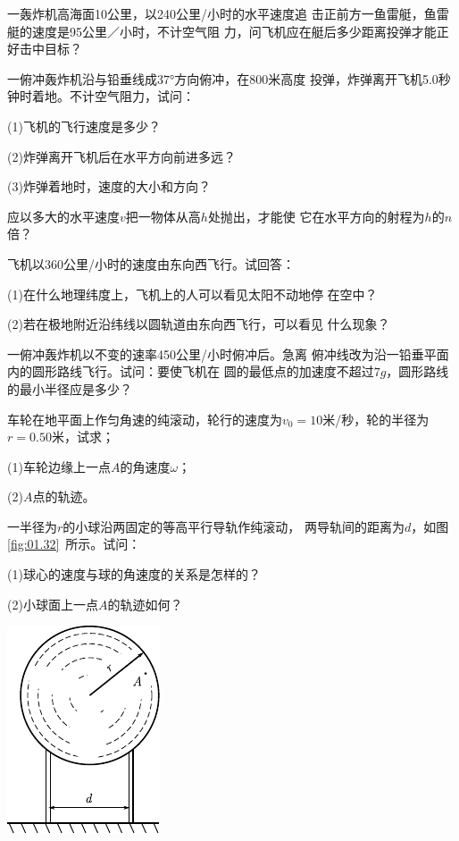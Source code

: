 \begin{exercises}
\exercise 一轰炸机高海面10公里，以240公里/小时的水平速度追
击正前方一鱼雷艇，鱼雷艇的速度是95公里／小时，不计空气阻
力，问飞机应在艇后多少距离投弹才能正好击中目标？

\exercise 一俯冲轰炸机沿与铅垂线成$\ang{37;;}$方向俯冲，在800米高度
投弹，炸弹离开飞机5.0秒钟时着地。不计空气阻力，试问：

(1)飞机的飞行速度是多少？

(2)炸弹离开飞机后在水平方向前进多远？

(3)炸弹着地时，速度的大小和方向？

\exercise 应以多大的水平速度$v$把一物体从高$h$处抛出，才能使
它在水平方向的射程为$h$的$n$倍？

\exercise 飞机以360公里/小时的速度由东向西飞行。试回答：

(1)在什么地理纬度上，飞机上的人可以看见太阳不动地停
在空中？

(2)若在极地附近沿纬线以圆轨道由东向西飞行，可以看见
什么现象？

\exercise 一俯冲轰炸机以不变的速率450公里/小时俯冲后。急离
俯冲线改为沿一铅垂平面内的圆形路线飞行。试问：要使飞机在
圆的最低点的加速度不超过$7g$，圆形路线的最小半径应是多少？

\exercise 车轮在地平面上作匀角速的纯滚动，轮行的速度为$v_0=
10$米/秒，轮的半径为$r=0.50$米，试求；

(1)车轮边缘上一点$A$的角速度$\omega$；

(2)$A$点的轨迹。

\exercise 一半径为$r$的小球沿两固定的等高平行导轨作纯滚动，
两导轨间的距离为$d$，如图\ref{fig:01.32}~所示。试问：

(1)球心的速度与球的角速度的关系是怎样的？

(2)小球面上一点$A$的轨迹如何？
\begin{figurex}
    \begin{center}
        \includegraphics{figure/fig01.32}
        \caption{}
        \label{fig:01.32}
    \end{center}
\end{figurex}

\end{exercises}